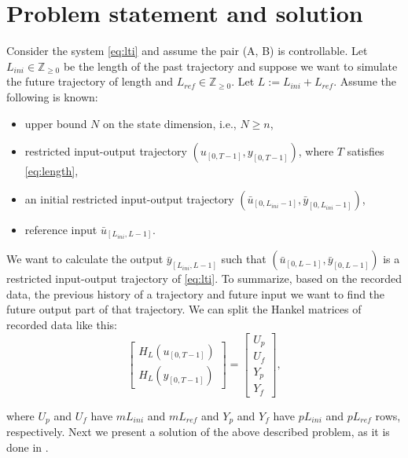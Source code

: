 \documentclass[12pt,a4paper]{report}
\begin{document}
\section{Problem statement and solution}
Consider the system \eqref{eq:lti} and assume the pair (A, B) is controllable. Let $L_{ini} \in \mathbb{Z}_{\geq 0}$ be the length of the past trajectory and suppose we want to simulate the
future trajectory of length and $L_{ref} \in \mathbb{Z}_{\geq 0}$. Let $L:=L_{ini} + L_{ref}$. Assume the following is known:
\begin{itemize}
    \item upper bound $N$ on the state dimension, i.e., $N \geq n$,
    \item restricted input-output trajectory \((u_{[0, T-1]}, y_{[0, T-1]})\), where $T$ satisfies \eqref{eq:length},
    \item an initial restricted input-output trajectory \((\bar{u}_{[0, L_{ini}-1]}, \bar{y}_{[0, L_{ini}-1]})\),
    \item reference input \(\bar{u}_{[L_{ini}, L-1]}\).
\end{itemize}

We want to calculate the output \(\bar{y}_{[L_{ini}, L-1]}\) such that \((\bar{u}_{[0, L-1]}, \bar{y}_{[0, L-1]})\) is a restricted input-output trajectory of \eqref{eq:lti}. To summarize, based
on the recorded data, the previous history of a trajectory and future input we want to find the future output part of that trajectory. We can split the Hankel matrices of recorded data like this:
\begin{equation}
    \begin{bmatrix} H_{L}(u_{[0, T-1]}) \\ H_{L}(y_{[0, T-1]})\end{bmatrix} = \begin{bmatrix}U_p \\ U_f \\ Y_p \\ Y_f\end{bmatrix},
    \label{eq:uy-pf}
\end{equation}

where $U_p$ and $U_f$ have $mL_{ini}$ and $mL_{ref}$ and $Y_p$ and $Y_f$ have $pL_{ini}$ and $pL_{ref}$ rows, respectively. Next we present a solution of the above described problem,
as it is done in \cite{dbcbook}.
\end{document}
